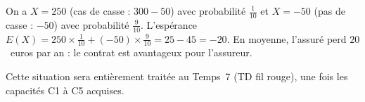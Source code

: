 On a $X = 250$ (cas de casse : $300 - 50$) avec probabilité $\frac{1}{10}$ et $X = -50$ (pas de casse : $-50$) avec probabilité $\frac{9}{10}$. L'espérance $E(X) = 250 \times \frac{1}{10} + (-50) \times \frac{9}{10} = 25 - 45 = -20$. En moyenne, l'assuré perd $20$~euros par an : le contrat est avantageux pour l'assureur.

Cette situation sera entièrement traitée au Temps~7 (TD fil rouge), une fois les capacités C1 à C5 acquises.

%
%
%
%
%
